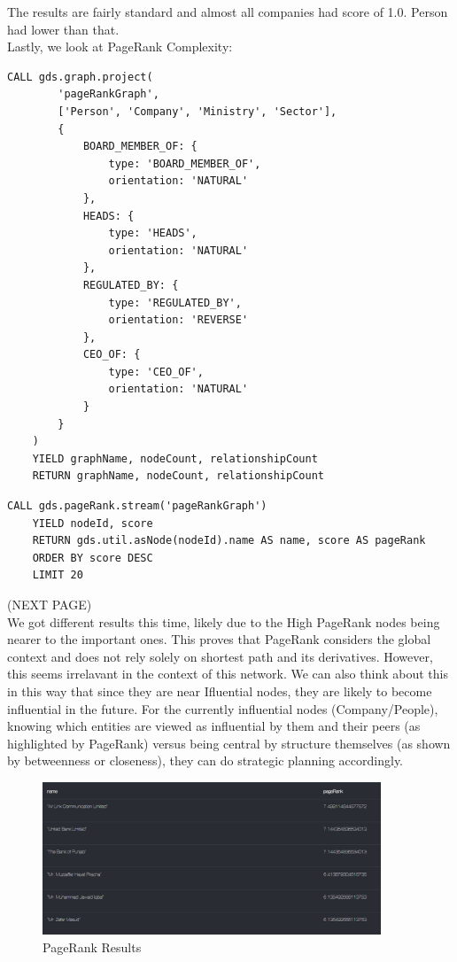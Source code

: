 \documentclass[12pt]{article}
\begin{document}
The results are fairly standard and almost all companies had score of 1.0. Person had lower than that. \\
Lastly, we look at PageRank Complexity:
\begin{lstlisting}[frame=single]
    CALL gds.graph.project(
        'pageRankGraph',
        ['Person', 'Company', 'Ministry', 'Sector'],
        {
            BOARD_MEMBER_OF: {
                type: 'BOARD_MEMBER_OF',
                orientation: 'NATURAL'
            },
            HEADS: {
                type: 'HEADS',
                orientation: 'NATURAL'
            },
            REGULATED_BY: {
                type: 'REGULATED_BY',
                orientation: 'REVERSE'
            },
            CEO_OF: {
                type: 'CEO_OF',
                orientation: 'NATURAL'
            }
        }
    )
    YIELD graphName, nodeCount, relationshipCount
    RETURN graphName, nodeCount, relationshipCount    
\end{lstlisting}
\begin{lstlisting}[frame=single]
    CALL gds.pageRank.stream('pageRankGraph')
    YIELD nodeId, score
    RETURN gds.util.asNode(nodeId).name AS name, score AS pageRank
    ORDER BY score DESC
    LIMIT 20
\end{lstlisting}
(NEXT PAGE)\\
We got different results this time, likely due to the High PageRank nodes being nearer to the important ones. This proves that PageRank considers the global context and does not rely solely on shortest path and its derivatives.
However, this seems irrelavant in the context of this network. We can also think about this in this way that since they are near Ifluential nodes, they are likely to become influential in the future.
For the currently influential nodes (Company/People), knowing which entities are viewed as influential by them and their peers (as highlighted by PageRank) versus being central by structure themselves (as shown by betweenness or closeness), they can do strategic planning accordingly.
\begin{figure}
    \centering
    \includegraphics[width=0.9\textwidth]{pagerank.png} 
    \caption{PageRank Results}
\end{figure}
\end{document}
